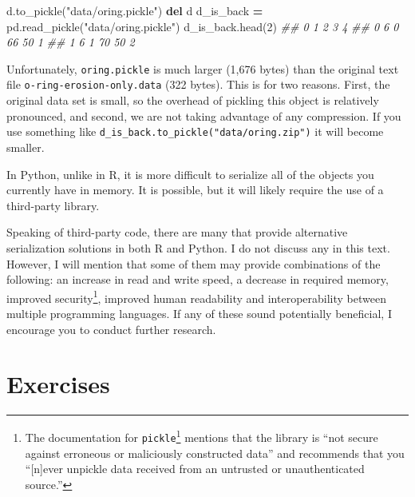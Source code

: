 \documentclass[
  12pt,
  krantz2]{krantz}
\makeatletter
\newenvironment{Shaded}{\begin{snugshade}}{\end{snugshade}}
\newcommand{\CommentTok}[1]{\textcolor[rgb]{0.37,0.37,0.37}{\textit{#1}}}
\newcommand{\DecValTok}[1]{\textcolor[rgb]{0.06,0.06,0.06}{#1}}
\newcommand{\KeywordTok}[1]{\textcolor[rgb]{0.27,0.27,0.27}{\textbf{#1}}}
\newcommand{\NormalTok}[1]{#1}
\newcommand{\OperatorTok}[1]{\textcolor[rgb]{0.43,0.43,0.43}{\textbf{#1}}}
\newcommand{\StringTok}[1]{\textcolor[rgb]{0.5,0.5,0.5}{#1}}
\renewcommand{\href}[2]{#2\footnote{\url{#1}}}
\newenvironment{kframe}{%
\medskip{}
\setlength{\fboxsep}{.8em}
 \def\at@end@of@kframe{}%
 \ifinner\ifhmode%
  \def\at@end@of@kframe{\end{minipage}}%
  \begin{minipage}{\columnwidth}%
 \fi\fi%
 \def\FrameCommand##1{\hskip\@totalleftmargin \hskip-\fboxsep
 \colorbox{shadecolor}{##1}\hskip-\fboxsep
     \hskip-\linewidth \hskip-\@totalleftmargin \hskip\columnwidth}%
 \MakeFramed {\advance\hsize-\width
   \@totalleftmargin\z@ \linewidth\hsize
   \@setminipage}}%
 {\par\unskip\endMakeFramed%
 \at@end@of@kframe}
\renewenvironment{Shaded}{\begin{kframe}}{\end{kframe}}
\newenvironment{rmd-caution}{\begin{lrbox}{\rmdbox}
  \minipage[c]{\dimexpr \textwidth-2\fboxrule-\wd\excl-\columnsep}
    \vspace*{\columnsep}}%
{\vspace*{\columnsep}\endminipage\end{lrbox}%
  {\par\color{yellow}\fboxsep=0pt
    \fbox{\usebox\excl\usebox\rmdbox\hspace{\columnsep}}\par}}
\makeatother
\begin{document}
\begin{Shaded}
\begin{Highlighting}[]
\NormalTok{d.to\_pickle(}\StringTok{"data/oring.pickle"}\NormalTok{)}
\KeywordTok{del}\NormalTok{ d}
\NormalTok{d\_is\_back }\OperatorTok{=}\NormalTok{ pd.read\_pickle(}\StringTok{"data/oring.pickle"}\NormalTok{)}
\NormalTok{d\_is\_back.head(}\DecValTok{2}\NormalTok{)}
\CommentTok{\#\#    0  1   2   3  4}
\CommentTok{\#\# 0  6  0  66  50  1}
\CommentTok{\#\# 1  6  1  70  50  2}
\end{Highlighting}
\end{Shaded}

\begin{rmd-caution}
Unfortunately, \texttt{oring.pickle} is much larger (1,676 bytes) than the original text file \texttt{o-ring-erosion-only.data} (322 bytes). This is for two reasons. First, the original data set is small, so the overhead of pickling this object is relatively pronounced, and second, we are not taking advantage of any compression. If you use something like \texttt{d\_is\_back.to\_pickle("data/oring.zip")} it will become smaller.

\end{rmd-caution}

In Python, unlike in R, it is more difficult to serialize all of the objects you currently have in memory. It is possible, but it will likely require the use of a third-party library.

Speaking of third-party code, there are many that provide alternative serialization solutions in both R and Python. I do not discuss any in this text. However, I will mention that some of them may provide combinations of the following: an increase in read and write speed, a decrease in required memory, improved security\footnote{The \href{https://docs.python.org/2/library/pickle.html}{documentation for \texttt{pickle}} mentions that the library is ``not secure against erroneous or maliciously constructed data'' and recommends that you ``{[}n{]}ever unpickle data received from an untrusted or unauthenticated source.''}, improved human readability and interoperability between multiple programming languages. If any of these sound potentially beneficial, I encourage you to conduct further research.

\hypertarget{exercises-7}{%
\section{Exercises}\label{exercises-7}}
\end{document}
